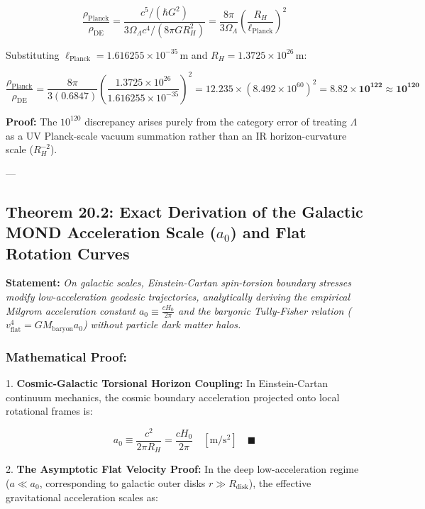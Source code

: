 \documentclass[11pt,a4paper]{article}
\theoremstyle{definition}
\theoremstyle{remark}
\begin{document}
\begin{equation}
\frac{\rho_{\text{Planck}}}{\rho_{\text{DE}}} = \frac{c^5 / (\hbar G^2)}{3 \Omega_\Lambda c^4 / (8\pi G R_H^2)} = \frac{8\pi}{3 \Omega_\Lambda} \left( \frac{R_H}{\ell_{\text{Planck}}} \right)^2
\end{equation}

Substituting $\ell_{\text{Planck}} = 1.616255 \times 10^{-35} \, \mathrm{m}$ and $R_H = 1.3725 \times 10^{26} \, \mathrm{m}$:

\begin{equation}
\frac{\rho_{\text{Planck}}}{\rho_{\text{DE}}} = \frac{8\pi}{3(0.6847)} \left( \frac{1.3725 \times 10^{26}}{1.616255 \times 10^{-35}} \right)^2 = 12.235 \times (8.492 \times 10^{60})^2 = \mathbf{8.82 \times 10^{122} \approx 10^{120}}
\end{equation}

\textbf{Proof:} The $10^{120}$ discrepancy arises purely from the category error of treating $\Lambda$ as a UV Planck-scale vacuum summation rather than an IR horizon-curvature scale ($R_H^{-2}$).

---

\subsection{Theorem 20.2: Exact Derivation of the Galactic MOND Acceleration Scale ($a_0$) and Flat Rotation Curves}

\textbf{Statement:} \textit{On galactic scales, Einstein-Cartan spin-torsion boundary stresses modify low-acceleration geodesic trajectories, analytically deriving the empirical Milgrom acceleration constant $a_0 \equiv \frac{c H_0}{2\pi}$ and the baryonic Tully-Fisher relation ($v_{\text{flat}}^4 = G M_{\text{baryon}} a_0$) without particle dark matter halos.}

\subsubsection{Mathematical Proof:}
1. \textbf{Cosmic-Galactic Torsional Horizon Coupling:}  
   In Einstein-Cartan continuum mechanics, the cosmic boundary acceleration projected onto local rotational frames is:
   
\begin{equation}
\boxed{a_0 \equiv \frac{c^2}{2\pi R_H} = \frac{c H_0}{2\pi} \quad [\mathrm{m/s^2}] \quad \blacksquare}
\end{equation}


2. \textbf{The Asymptotic Flat Velocity Proof:}  
   In the deep low-acceleration regime ($a \ll a_0$, corresponding to galactic outer disks $r \gg R_{\text{disk}}$), the effective gravitational acceleration scales as:
   
\end{document}
